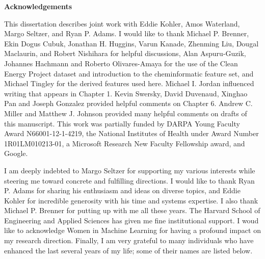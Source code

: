 \newpage

\begin{spacing}{1.5}

\begin{center}
\textsf{\textbf{Acknowledgements}} \\
\end{center}

This dissertation describes joint work with 
Eddie Kohler, Amos Waterland, Margo Seltzer, and Ryan P. Adams.
I would like to thank Michael P. Brenner, Ekin Dogus Cubuk, Jonathan H. Huggins, Varun Kanade, Zhenming Liu, Dougal Maclaurin, and Robert Nishihara for helpful discussions, Alan Aspuru-Guzik, Johannes Hachmann and Roberto Olivares-Amaya for the use of the Clean Energy Project dataset and introduction to the cheminformatic feature set, and Michael Tingley for the derived features used here. 
Michael I. Jordan influenced writing that appears in Chapter 1.
Kevin Swersky, David Duvenaud, Xinghao Pan and Joseph Gonzalez provided helpful comments on Chapter 6.
Andrew C. Miller and Matthew J. Johnson provided many helpful comments on drafts of this manuscript. This work was partially funded by DARPA Young Faculty Award {N66001-12-1-4219}, the National Institutes of Health under Award Number {1R01LM010213-01}, a Microsoft Research New Faculty Fellowship award, and Google.

I am deeply indebted to Margo Seltzer for supporting my various interests while steering me toward concrete and fulfilling directions.
I would like to thank Ryan P. Adams for sharing his enthusiasm and ideas on diverse topics, and Eddie Kohler for incredible generosity with his time and systems expertise.
I also thank Michael P. Brenner for putting up with me all these years.
The Harvard School of Engineering and Applied Sciences has given me fine institutional support.
I woud like to acknowledge Women in Machine Learning for having a profound impact on my research direction. 
Finally, I am very grateful to many individuals who have enhanced the last several years of my life; some of their names are listed below. 
\end{spacing}

\vspace{-1em}

